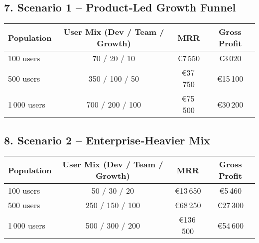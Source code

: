 \subsection*{7. Scenario 1 – Product‑Led Growth Funnel}
\begin{center}
\begin{tabular}{@{}lccc@{}}
\toprule
\textbf{Population} & \textbf{User Mix} (Dev / Team / Growth) & \textbf{MRR} & \textbf{Gross Profit} \\
\midrule
100 users   & 70 / 20 / 10    & €7\,550   & €3\,020  \\
500 users   & 350 / 100 / 50  & €37\,750  & €15\,100 \\
1\,000 users & 700 / 200 / 100 & €75\,500  & €30\,200 \\
\bottomrule
\end{tabular}
\end{center}

\subsection*{8. Scenario 2 – Enterprise‑Heavier Mix}
\begin{center}
\begin{tabular}{@{}lccc@{}}
\toprule
\textbf{Population} & \textbf{User Mix} (Dev / Team / Growth) & \textbf{MRR} & \textbf{Gross Profit} \\
\midrule
100 users   & 50 / 30 / 20   & €13\,650  & €5\,460  \\
500 users   & 250 / 150 / 100 & €68\,250  & €27\,300 \\
1\,000 users & 500 / 300 / 200 & €136\,500 & €54\,600 \\
\bottomrule
\end{tabular}
\end{center}
